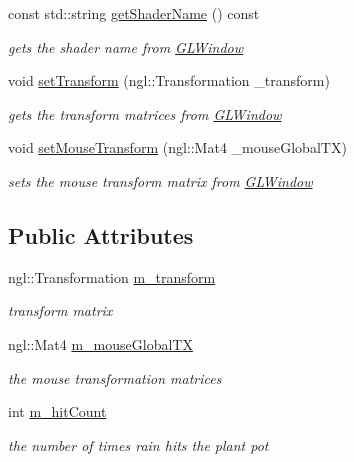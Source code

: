 \begin{DoxyCompactItemize}
const std::string \hyperlink{classWeather_a56d1feb426ec64dbd0d739cf18ed697e}{getShaderName} () const 
\begin{DoxyCompactList}\small\item\em gets the shader name from \hyperlink{classGLWindow}{GLWindow} \item\end{DoxyCompactList}\item 
void \hyperlink{classWeather_ad3fcb872dcd988251b3feb29bf4b1303}{setTransform} (ngl::Transformation \_\-transform)
\begin{DoxyCompactList}\small\item\em gets the transform matrices from \hyperlink{classGLWindow}{GLWindow} \item\end{DoxyCompactList}\item 
void \hyperlink{classWeather_a9440d21e6228408df6b899230355d8b6}{setMouseTransform} (ngl::Mat4 \_\-mouseGlobalTX)
\begin{DoxyCompactList}\small\item\em sets the mouse transform matrix from \hyperlink{classGLWindow}{GLWindow} \item\end{DoxyCompactList}\end{DoxyCompactItemize}
\subsection*{Public Attributes}
\begin{DoxyCompactItemize}
\item 
ngl::Transformation \hyperlink{classWeather_a7b932337076098438c197a9a1903a057}{m\_\-transform}
\begin{DoxyCompactList}\small\item\em transform matrix \item\end{DoxyCompactList}\item 
ngl::Mat4 \hyperlink{classWeather_a4785be21c9bf7a7a67645fc08729d66e}{m\_\-mouseGlobalTX}
\begin{DoxyCompactList}\small\item\em the mouse transformation matrices \item\end{DoxyCompactList}\item 
int \hyperlink{classWeather_a5865ebcfd559433fe19caa4f53e0d61f}{m\_\-hitCount}
\begin{DoxyCompactList}\small\item\em the number of times rain hits the plant pot \item\end{DoxyCompactList}\end{DoxyCompactItemize}


